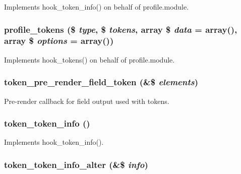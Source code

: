 \label{token_8tokens_8inc_ab97ba048343fb5e851742c14a5094dff}
Implements hook\_\-token\_\-info() on behalf of profile.module. \hypertarget{token_8tokens_8inc_a4518396f5dcfa6d62520bcde83355887}{
\subsubsection[{profile\_\-tokens}]{\setlength{\rightskip}{0pt plus 5cm}profile\_\-tokens (\$ {\em type}, \/  \$ {\em tokens}, \/  array \$ {\em data} = {\ttfamily array()}, \/  array \$ {\em options} = {\ttfamily array()})}}
\label{token_8tokens_8inc_a4518396f5dcfa6d62520bcde83355887}
Implements hook\_\-tokens() on behalf of profile.module. \hypertarget{token_8tokens_8inc_af364a1d0d72ea86fb76670a270ceb7fe}{
\subsubsection[{token\_\-pre\_\-render\_\-field\_\-token}]{\setlength{\rightskip}{0pt plus 5cm}token\_\-pre\_\-render\_\-field\_\-token (\&\$ {\em elements})}}
\label{token_8tokens_8inc_af364a1d0d72ea86fb76670a270ceb7fe}
Pre-\/render callback for field output used with tokens. \hypertarget{token_8tokens_8inc_a4f24fde1a5b2d27bae2edf4e415ebb67}{
\subsubsection[{token\_\-token\_\-info}]{\setlength{\rightskip}{0pt plus 5cm}token\_\-token\_\-info ()}}
\label{token_8tokens_8inc_a4f24fde1a5b2d27bae2edf4e415ebb67}
Implements hook\_\-token\_\-info(). \hypertarget{token_8tokens_8inc_ad634dc57d9d19bb21135a670ef40e95f}{
\subsubsection[{token\_\-token\_\-info\_\-alter}]{\setlength{\rightskip}{0pt plus 5cm}token\_\-token\_\-info\_\-alter (\&\$ {\em info})}}
